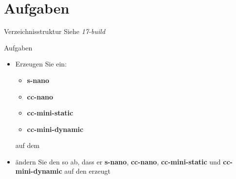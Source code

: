 \section{Aufgaben}

\begin{frame}{Verzeichnisstruktur}
 Siehe {\em 17-build}
\end{frame}


\begin{frame}{Aufgaben}
 \begin{itemize}
  \item Erzeugen Sie ein:
  \begin{itemize}
   \item {\bf s-nano}
   \item {\bf cc-nano}
   \item {\bf cc-mini-static}
   \item {\bf cc-mini-dynamic}
  \end{itemize}
  auf dem \targetS\ 
  \item ändern Sie den  so ab, dass er {\bf s-nano}, {\bf cc-nano}, 
  {\bf cc-mini-static} und {\bf cc-mini-dynamic} auf den \host erzeugt
 \end{itemize}
\end{frame}

